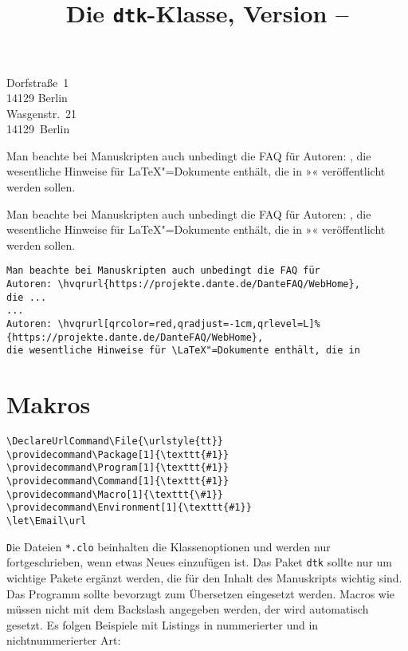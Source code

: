 \documentclass[ngerman]{dtk}
\let\File\texttt
\let\Package\texttt
\begin{document}
\title{Die \texttt{dtk}-Klasse, Version \DTKversion -- \DTKversiondate}
%
    {Dorfstraße~1\\
     14129 Berlin\\
     }
%
    {Wasgenstr.~21\\
     14129~Berlin\\
     }
\maketitle

Man beachte bei Manuskripten auch unbedingt die FAQ für 
Autoren: ,
die wesentliche Hinweise für \LaTeX"=Dokumente enthält, die in 
»\DTK« veröffentlicht werden sollen.
\blindtext

Man beachte bei Manuskripten auch unbedingt die FAQ für 
Autoren: ,
die wesentliche Hinweise für \LaTeX"=Dokumente enthält, die in 
»\DTK« veröffentlicht werden sollen.


\begin{verbatim}
Man beachte bei Manuskripten auch unbedingt die FAQ für 
Autoren: \hvqrurl{https://projekte.dante.de/DanteFAQ/WebHome},
die ...
...
Autoren: \hvqrurl[qrcolor=red,qradjust=-1cm,qrlevel=L]%
{https://projekte.dante.de/DanteFAQ/WebHome},
die wesentliche Hinweise für \LaTeX"=Dokumente enthält, die in 

\end{verbatim}



\section{Makros}

\begin{verbatim}
\DeclareUrlCommand\File{\urlstyle{tt}}
\providecommand\Package[1]{\texttt{#1}}
\providecommand\Program[1]{\texttt{#1}}
\providecommand\Command[1]{\texttt{#1}}
\providecommand\Macro[1]{\texttt{\#1}}
\providecommand\Environment[1]{\texttt{#1}}
\let\Email\url
\end{verbatim}


\show\File
Die Dateien \File{*.clo} beinhalten die Klassenoptionen und
werden nur fortgeschrieben, wenn etwas Neues einzufügen ist. Das Paket
\Package{dtk} sollte nur um wichtige Pakete ergänzt werden, die für den Inhalt
des Manuskripts wichtig sind. Das Programm  sollte bevorzugt
zum Übersetzen eingesetzt werden. Macros wie  müssen nicht mit
dem Backslash angegeben werden, der wird automatisch gesetzt. Es folgen
Beispiele mit Listings in nummerierter und in nichtnummerierter Art:
\end{document}
